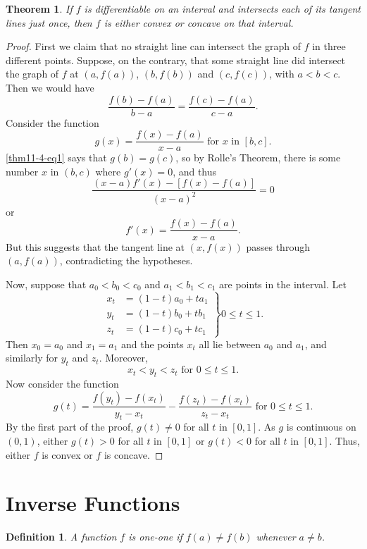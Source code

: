 \documentclass{article}
\numberwithin{corollary}{subsection}
\newtheorem{definition}{Definition}
\numberwithin{definition}{subsection}
\numberwithin{lemma}{subsection}
\newtheorem{theorem}{Theorem}
\numberwithin{theorem}{subsection}
\begin{document}
\begin{theorem}
  If $f$ is differentiable on an interval and intersects each of its tangent
  lines just once, then $f$ is either convex or concave on that interval.
\end{theorem}
\begin{proof}
  First we claim that no straight line can intersect the graph of $f$ in three
  different points. Suppose, on the contrary, that some straight line did
  intersect the graph of $f$ at $(a, f(a))$, $(b, f(b))$ and $(c, f(c))$, with
  $a < b < c$. Then we would have \[ \label{thm11-4-eq1} \tag{1}
    \frac{f(b) - f(a)}{b - a} = \frac{f(c) - f(a)}{c - a}.
  \] Consider the function \[
    g(x) = \frac{f(x) - f(a)}{x - a} \text{ for } x \text{ in } [b, c].
  \] \eqref{thm11-4-eq1} says that $g(b) = g(c)$, so by Rolle's Theorem, there
  is some number $x$ in $(b, c)$ where $g'(x) = 0$, and thus \[
    \frac{(x - a)f'(x) - [f(x) - f(a)]}{(x - a)^2} = 0
  \] or \[
    f'(x) = \frac{f(x) - f(a)}{x - a}.
  \] But this suggests that the tangent line at $(x, f(x))$ passes through
  $(a, f(a))$, contradicting the hypotheses.

  Now, suppose that $a_0 < b_0 < c_0$ and $a_1 < b_1 < c_1$ are points in the
  interval. Let \[
    \left.
    \begin{aligned}
      x_t &= (1 - t)a_0 + ta_1 \\
      y_t &= (1 - t)b_0 + tb_1 \\
      z_t &= (1 - t)c_0 + tc_1
    \end{aligned}
    \right\} 0 \leq t \leq 1.
  \] Then $x_0 = a_0$ and $x_1 = a_1$ and the points $x_t$ all lie between
  $a_0$ and $a_1$, and similarly for $y_t$ and $z_t$. Moreover, \[
    x_t < y_t < z_t \text{ for } 0 \leq t \leq 1.
  \] Now consider the function \[
    g(t) = \frac{f(y_t) - f(x_t)}{y_t - x_t} -
    \frac{f(z_t) - f(x_t)}{z_t - x_t} \text{ for } 0 \leq t \leq 1.
  \] By the first part of the proof, $g(t) \neq 0$ for all $t$ in $[0, 1]$. As
  $g$ is continuous on $(0, 1)$, either $g(t) > 0$ for all $t$ in $[0, 1]$ or
  $g(t) < 0$ for all $t$ in $[0, 1]$. Thus, either $f$ is convex or $f$ is
  concave.
\end{proof}

\section{Inverse Functions}

\begin{definition}
  A function $f$ is \emph{one-one} if $f(a) \neq f(b)$ whenever $a \neq b$.
\end{definition}
\end{document}
